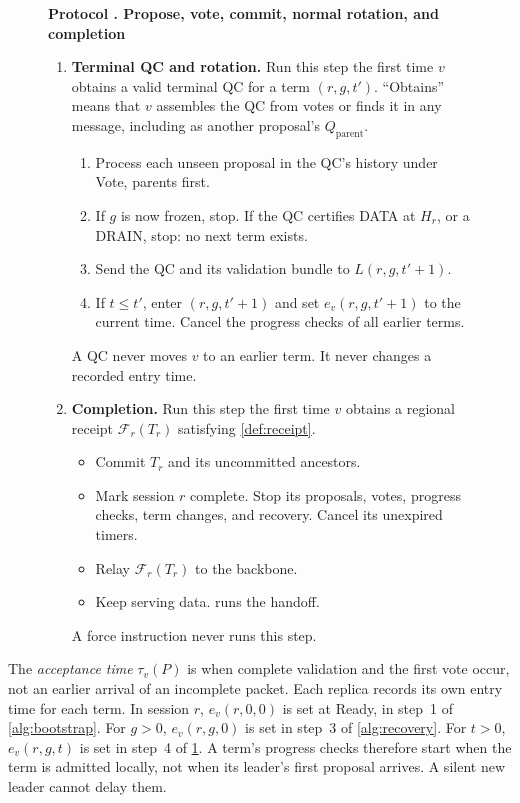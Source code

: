 \documentclass[11pt,a4paper]{article}
\newcommand{\RR}[1]{{\color{rrRed}#1}}
\newcommand{\FC}{\mathcal F}
\newcommand{\defterm}[1]{\textcolor{rrBlue}{\textit{#1}}}
\newcounter{protocol}
\newenvironment{protocol}[2]{\begin{figure}[htbp]\refstepcounter{protocol}\label{#1}
\begin{mdframed}[linewidth=.6pt,skipabove=0pt,skipbelow=0pt,
innertopmargin=7pt,innerbottommargin=7pt]\small
\textbf{Protocol \theprotocol. #2}\par\smallskip}{\end{mdframed}\end{figure}}
\begin{document}
\begin{protocol}{alg:steady}{Propose, vote, commit, normal rotation\RR{, and completion}}
\begin{enumerate}[label=\textbf{\arabic*)},itemsep=3pt]
\item \textbf{Terminal QC and rotation.} Run this step the first time
$v$ obtains a valid terminal QC for a term $(r,g,t')$.
``Obtains'' means that $v$ assembles the QC from votes or finds it in
any message, including as another proposal's $Q_{\mathrm{parent}}$.
 \begin{enumerate}[label=(\alph*)]
 \item Process each unseen proposal in the QC's history under Vote,
       parents first.
 \item If $g$ is now frozen, stop. \RR{If the QC certifies DATA at
       $H_r$, or a DRAIN, stop: no next term exists.}
 \item Send the QC and its validation bundle to $L(r,g,t'+1)$.
 \item If $t\le t'$, enter $(r,g,t'+1)$ and set $e_v(r,g,t'+1)$ to the
       current time. Cancel the progress checks of all earlier
       terms.
 \end{enumerate}
 A QC never moves $v$ to an earlier term. It never changes a recorded
 entry time.

\item \RR{\textbf{Completion.} Run this step the first time $v$ obtains a
regional receipt $\FC_r(T_r)$ satisfying \cref{def:receipt}.}
 \begin{itemize}\color{rrRed}
 \item Commit $T_r$ and its uncommitted ancestors.
 \item Mark session $r$ complete. Stop its proposals, votes, progress
       checks, term changes, and recovery. Cancel its unexpired timers.
 \item Relay $\FC_r(T_r)$ to the backbone.
 \item Keep serving data.  runs the handoff.
 \end{itemize}
 \RR{A force instruction never runs this step.}
\end{enumerate}
\end{protocol}

The \defterm{acceptance time} $\tau_v(P)$ is when complete validation and the first
vote occur, not an earlier arrival of an incomplete packet. Each replica
records its own entry time for each term. In session $r$, $e_v(r,0,0)$ is
set at Ready, in step~1 of \cref{alg:bootstrap}. For $g>0$, $e_v(r,g,0)$ is
set in step~3 of \cref{alg:recovery}. For $t>0$, $e_v(r,g,t)$ is set in
step~4 of \cref{alg:steady}. A term's progress checks therefore start
when the term is admitted locally, not when its leader's first proposal
arrives. A silent new leader cannot delay them.
\end{document}
